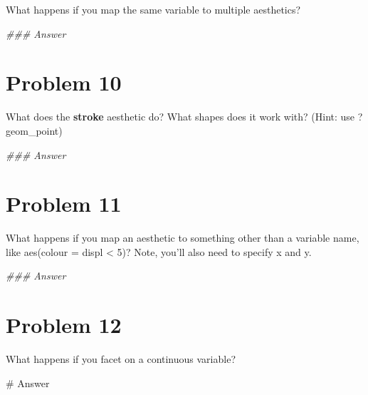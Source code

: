 \documentclass[
  letterpaper,
  DIV=11,
  numbers=noendperiod]{scrreprt}
\newenvironment{Shaded}{\begin{snugshade}}{\end{snugshade}}
\newcommand{\CommentTok}[1]{\textcolor[rgb]{0.37,0.37,0.37}{#1}}
\newcommand{\DocumentationTok}[1]{\textcolor[rgb]{0.37,0.37,0.37}{\textit{#1}}}
\begin{document}

What happens if you map the same variable to multiple aesthetics?

\begin{Shaded}
\begin{Highlighting}[]
\DocumentationTok{\#\#\# Answer}
\end{Highlighting}
\end{Shaded}

\section*{Problem 10}\label{problem-10-1}


What does the \textbf{stroke} aesthetic do? What shapes does it work
with? (Hint: use ?geom\_point)

\begin{Shaded}
\begin{Highlighting}[]
\DocumentationTok{\#\#\# Answer}
\end{Highlighting}
\end{Shaded}

\section*{Problem 11}\label{problem-11-1}


What happens if you map an aesthetic to something other than a variable
name, like aes(colour = displ \textless{} 5)? Note, you'll also need to
specify x and y.

\begin{Shaded}
\begin{Highlighting}[]
\DocumentationTok{\#\#\# Answer}
\end{Highlighting}
\end{Shaded}

\section*{Problem 12}\label{problem-12-1}


What happens if you facet on a continuous variable?

\begin{Shaded}
\begin{Highlighting}[]
\CommentTok{\# Answer}
\end{Highlighting}
\end{Shaded}
\end{document}
